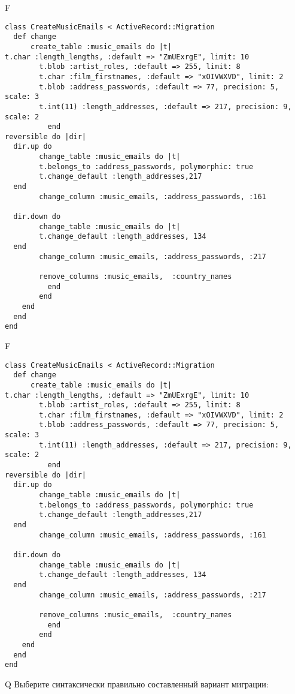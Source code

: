F
\begin{verbatim}
class CreateMusicEmails < ActiveRecord::Migration
  def change
	  create_table :music_emails do |t|
t.char :length_lengths, :default => "ZmUExrgE", limit: 10
		t.blob :artist_roles, :default => 255, limit: 8
		t.char :film_firstnames, :default => "xOIVWXVD", limit: 2
		t.blob :address_passwords, :default => 77, precision: 5, scale: 3
		t.int(11) :length_addresses, :default => 217, precision: 9, scale: 2
		  end
reversible do |dir|
  dir.up do
		change_table :music_emails do |t|
		t.belongs_to :address_passwords, polymorphic: true
 		t.change_default :length_addresses,217
  end
 		change_column :music_emails, :address_passwords, :161
   
  dir.down do
		change_table :music_emails do |t|
		t.change_default :length_addresses, 134
  end
 		change_column :music_emails, :address_passwords, :217
   
		remove_columns :music_emails,  :country_names 
	      end
	    end
    end 
  end
end

\end{verbatim}

F
\begin{verbatim}
class CreateMusicEmails < ActiveRecord::Migration
  def change
	  create_table :music_emails do |t|
t.char :length_lengths, :default => "ZmUExrgE", limit: 10
		t.blob :artist_roles, :default => 255, limit: 8
		t.char :film_firstnames, :default => "xOIVWXVD", limit: 2
		t.blob :address_passwords, :default => 77, precision: 5, scale: 3
		t.int(11) :length_addresses, :default => 217, precision: 9, scale: 2
		  end
reversible do |dir|
  dir.up do
		change_table :music_emails do |t|
		t.belongs_to :address_passwords, polymorphic: true
 		t.change_default :length_addresses,217
  end
 		change_column :music_emails, :address_passwords, :161
   
  dir.down do
		change_table :music_emails do |t|
		t.change_default :length_addresses, 134
  end
 		change_column :music_emails, :address_passwords, :217
   
		remove_columns :music_emails,  :country_names 
	      end
	    end
    end 
  end
end

\end{verbatim}

Q
Выберите синтаксически правильно составленный вариант миграции:

